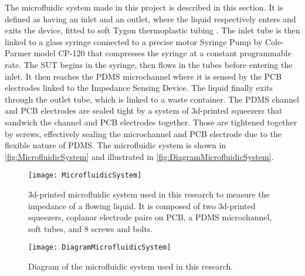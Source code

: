 The microfluidic system made in this project is described in this section. It is defined as having an inlet and an outlet, where the liquid respectively enters and exits the device, fitted to soft Tygon thermoplastic tubing \cite{Olanrewaju2018}. The inlet tube is then linked to a glass syringe connected to a precise motor Syringe Pump by Cole-Parmer model CP-120 that compresses the syringe at a constant programmable rate. The SUT begins in the syringe, then flows in the tubes before entering the inlet. It then reaches the PDMS microchannel where it is sensed by the PCB electrodes linked to the Impedance Sensing Device. The liquid finally exits through the outlet tube, which is linked to a waste container. The PDMS channel and PCB electrodes are sealed tight by a system of 3d-printed squeezers that sandwich the channel and PCB electrodes together. Those are tightened together by screws, effectively sealing the microchannel and PCB electrode due to the flexible nature of PDMS. The microfluidic system is shown in \autoref{fig:MicrofluidicSystem} and illustrated in \autoref{fig:DiagramMicrofluidicSystem}. \par
\begin{figure}[h]
    \centering
    \texttt{[image: MicrofluidicSystem]}
    \caption{3d-printed microfluidic system used in this research to measure the impedance of a flowing liquid. It is composed of two 3d-printed squeezers, coplanar electrode pairs on PCB, a PDMS microchannel, soft tubes, and 8 screws and bolts.}
    \label{fig:MicrofluidicSystem}
\end{figure}
\begin{figure}[h]
    \centering
    \texttt{[image: DiagramMicrofluidicSystem]}
    \caption{Diagram of the microfluidic system used in this research.}
    \label{fig:DiagramMicrofluidicSystem}
\end{figure}

